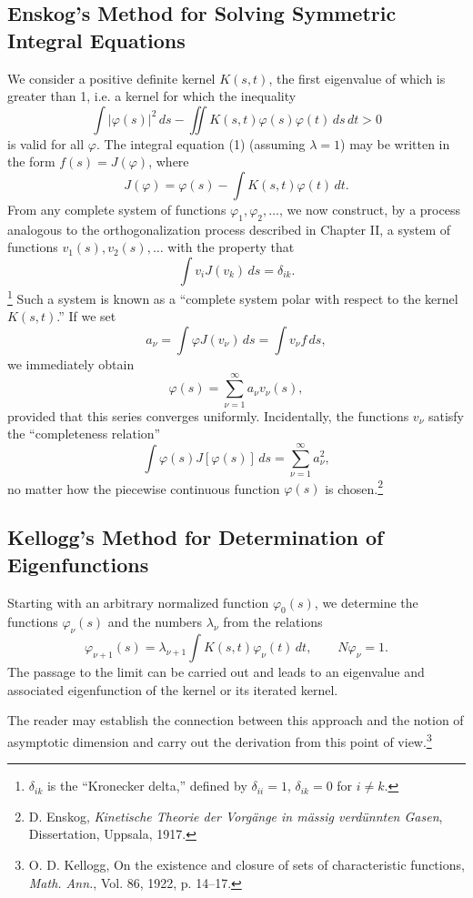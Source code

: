 \subsection{Enskog's Method for Solving Symmetric Integral Equations}
We consider a positive definite kernel $K(s,t)$, the first eigenvalue of which is greater than 1, i.e. a kernel for which the inequality
\[
\int|\varphi(s)|^2\,ds-\iint K(s,t)\varphi(s)\varphi(t)\,ds\,dt>0
\]
is valid for all $\varphi$. The integral equation (1) (assuming $\lambda=1$) may be written in the form $f(s)=J(\varphi)$, where
\[
J(\varphi)=\varphi(s)-\int K(s,t)\varphi(t)\,dt.
\]
From any complete system of functions $\varphi_1,\varphi_2,\ldots$, we now construct, by a process analogous to the orthogonalization process described in Chapter II, a system of functions $v_1(s),v_2(s),\ldots$ with the property that
\[
\int v_iJ(v_k)\,ds=\delta_{ik}.
\]
\footnote{$\delta_{ik}$ is the ``Kronecker delta,'' defined by $\delta_{ii}=1$, $\delta_{ik}=0$ for $i\ne k$.}
Such a system is known as a ``complete system polar with respect to the kernel $K(s,t)$.'' If we set
\[
a_\nu=\int\varphi J(v_\nu)\,ds=\int v_\nu f\,ds,
\]
we immediately obtain
\[
\varphi(s)=\sum_{\nu=1}^{\infty}a_\nu v_\nu(s),
\]
provided that this series converges uniformly. Incidentally, the functions $v_\nu$ satisfy the ``completeness relation''
\[
\int\varphi(s)J[\varphi(s)]\,ds=\sum_{\nu=1}^{\infty}a_\nu^2,
\]
no matter how the piecewise continuous function $\varphi(s)$ is chosen.\footnote{D. Enskog, \emph{Kinetische Theorie der Vorg\"ange in m\"assig verd\"unnten Gasen}, Dissertation, Uppsala, 1917.}

\subsection{Kellogg's Method for Determination of Eigenfunctions}
Starting with an arbitrary normalized function $\varphi_0(s)$, we determine the functions $\varphi_\nu(s)$ and the numbers $\lambda_\nu$ from the relations
\[
\varphi_{\nu+1}(s)=\lambda_{\nu+1}\int K(s,t)\varphi_\nu(t)\,dt,
\qquad N\varphi_\nu=1.
\]
The passage to the limit can be carried out and leads to an eigenvalue and associated eigenfunction of the kernel or its iterated kernel.

The reader may establish the connection between this approach and the notion of asymptotic dimension and carry out the derivation from this point of view.\footnote{O. D. Kellogg, On the existence and closure of sets of characteristic functions, \emph{Math. Ann.}, Vol. 86, 1922, p. 14--17.}

